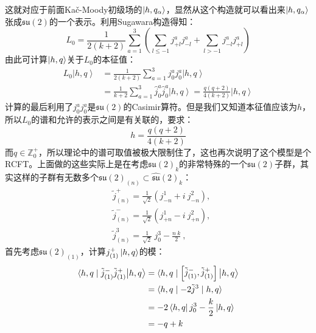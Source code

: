 这就对应于前面Ka\v{c}\mbox{-}Moody初级场的$\ket{h,q_\alpha}$，显然从这个构造就可以看出来$\ket{h,q_\alpha}$张成$\mathfrak{su}(2)$的一个表示。利用Sugawara构造得知：
\begin{equation}
	L_0=\frac1{2\left(k+2\right)}\sum_{a=1}^3\left(\sum_{l\leq-1}j_{+l}^aj_{-l}^a+\sum_{l>-1}j_{-l}^aj_{+l}^a\right)
\end{equation}
由此可计算$\ket{h,q}$关于$L_0$的本征值：
\begin{equation}
	\begin{aligned}
		L_{0}\left|h,q\right\rangle & =\frac1{2\left(k+2\right)}\sum_{a=1}^{3}j_{0}^{a}j_{0}^{a}\left|h,q\right\rangle   \\
		&=\frac1{k+2}\sum_{a=1}^3\hat{j}_0^a\hat{j}_0^a\left|h,q\right\rangle=\frac{q(q+2)}{4(k+2)}\left|h,q\right\rangle 
	\end{aligned}
\end{equation}
计算的最后利用了$j_0^aj_0^a$是$\mathfrak{su}(2)$的Casimir算符。但是我们又知道本征值应该为$h$，所以$L_0$的谱和允许的表示之间是有关联的，要求：
\begin{equation}
	\boxed{
		h=\frac{q(q+2)}{4(k+2)}
	}
\end{equation}
而$q\in\mathbb{Z}^+_0$，所以理论中的谱可取值被极大限制住了，这也再次说明了这个模型是个RCFT。上面做的这些实际上是在考虑$\widehat{\mathfrak{su}}(2)_k$的非常特殊的一个$\mathfrak{su}(2)$子群，其实这样的子群有无数多个$\mathfrak{su}(2)_{(n)}\subset\widehat{\mathfrak{su}}(2)_k$：
\begin{equation}
	\boxed{
		\begin{aligned}
			&\widetilde{j}_{(n)}^+ =\frac1{\sqrt{2}}\left(j_{-n}^1+i~j_{-n}^2\right),  \\
			&\widetilde{j}_{(n)}^- =\frac1{\sqrt{2}}\left(j_{+n}^1-i~j_{+n}^2\right),  \\
			&\widetilde{j}_{(n)}^{3} =\frac1{\sqrt{2}}~j_0^3-\frac{n~k}2~, 
		\end{aligned}
	}
\end{equation}
首先考虑$\mathfrak{su}(2)_{(1)}$，计算$j^+_{(1)}\ket{h,q}$的模：
\begin{equation}
	\begin{aligned}
		\langle h,q\mid\tilde{j}^{-}_{(1)}\tilde{j}^{+}_{(1)}\big|h,q\big\rangle & =\langle h,q\mid\begin{bmatrix}\tilde{j}^-_{(1)},\tilde{j}^+_{(1)}\end{bmatrix}\big|h,q\big\rangle   \\
		&=\langle h,q\mid-2\tilde{j}^3\mid h,q\rangle  \\
		&=-2\bra{h,q}j_0^3-\frac k{2}\ket{h,q} \\
		&=-q+k
	\end{aligned}
\end{equation}
